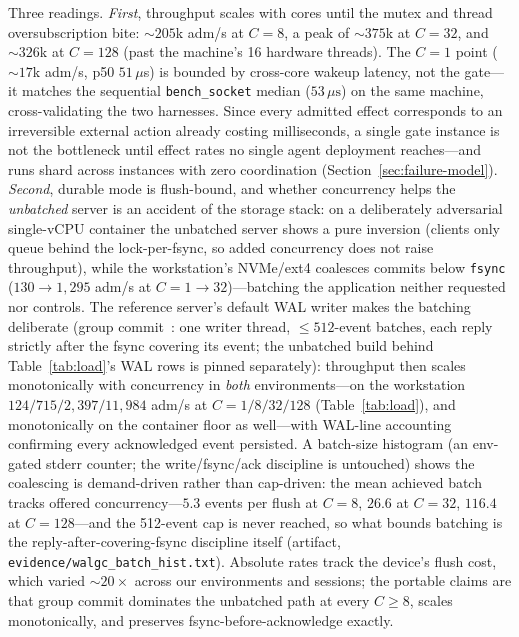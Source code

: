 \documentclass[10pt,journal,compsoc]{IEEEtran}
\newcommand{\SOCKETMED}{53\,\mu\mathrm{s}}%
\begin{document}
Three readings. \emph{First}, throughput scales with cores until the mutex
and thread oversubscription bite: ${\sim}205$k adm/s at $C{=}8$, a peak of
${\sim}375$k at $C{=}32$, and ${\sim}326$k at $C{=}128$ (past the machine's
16 hardware threads). The $C{=}1$ point (${\sim}17$k adm/s, p50 $51\,\mu$s)
is bounded by cross-core wakeup latency, not the gate---it matches the
sequential \texttt{bench\_socket} median ($\SOCKETMED$) on the same machine,
cross-validating the two harnesses. Since every admitted effect corresponds
to an irreversible external action already costing milliseconds, a single
gate instance is not the bottleneck until effect rates no single agent
deployment reaches---and runs shard across instances with zero coordination
(Section~\ref{sec:failure-model}). \emph{Second}, durable mode is flush-bound, and whether concurrency helps
the \emph{unbatched} server is an accident of the storage stack: on a
deliberately adversarial single-vCPU container the unbatched server shows a
pure inversion (clients only queue behind the lock-per-fsync, so added
concurrency does not raise throughput), while the workstation's NVMe/ext4
coalesces commits below \texttt{fsync} ($130{\to}1{,}295$ adm/s at
$C{=}1{\to}32$)---batching the application neither requested nor controls.
The reference server's default WAL writer makes the batching deliberate
(group commit~\cite{dewitt84}: one writer thread, ${\leq}512$-event batches,
each reply strictly after the fsync covering its event; the unbatched build
behind Table~\ref{tab:load}'s WAL rows is pinned separately): throughput then
scales monotonically with concurrency in \emph{both} environments---on the
workstation $124/715/2{,}397/11{,}984$ adm/s at $C{=}1/8/32/128$
(Table~\ref{tab:load}), and monotonically on the container floor as
well---with WAL-line accounting confirming every acknowledged event
persisted. A batch-size histogram (an env-gated stderr
counter; the write/fsync/ack discipline is untouched) shows the coalescing
is demand-driven rather than cap-driven: the mean achieved batch tracks
offered concurrency---$5.3$ events per flush at $C{=}8$, $26.6$ at $C{=}32$,
$116.4$ at $C{=}128$---and the 512-event cap is never reached, so what
bounds batching is the reply-after-covering-fsync discipline itself
(artifact, \texttt{evidence/walgc\_batch\_hist.txt}). Absolute rates track
the device's flush cost, which varied ${\sim}20{\times}$ across our
environments and sessions; the portable claims are that group commit
dominates the unbatched path at every $C{\geq}8$, scales monotonically, and
preserves fsync-before-acknowledge exactly.
\end{document}
